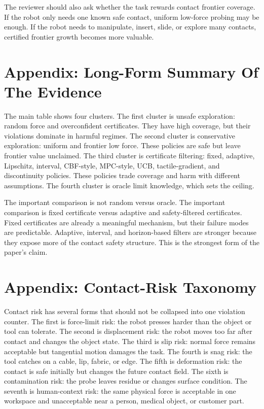 \documentclass{article}
\begin{document}
The reviewer should also ask whether the task rewards contact frontier
coverage. If the robot only needs one known safe contact, uniform low-force
probing may be enough. If the robot needs to manipulate, insert, slide, or
explore many contacts, certified frontier growth becomes more valuable.

\section{Appendix: Long-Form Summary Of The Evidence}

The main table shows four clusters. The first cluster is unsafe exploration:
random force and overconfident certificates. They have high coverage, but their
violations dominate in harmful regimes. The second cluster is conservative
exploration: uniform and frontier low force. These policies are safe but leave
frontier value unclaimed. The third cluster is certificate filtering: fixed,
adaptive, Lipschitz, interval, CBF-style, MPC-style, UCB, tactile-gradient, and
discontinuity policies. These policies trade coverage and harm with different
assumptions. The fourth cluster is oracle limit knowledge, which sets the
ceiling.

The important comparison is not random versus oracle. The important comparison
is fixed certificate versus adaptive and safety-filtered certificates. Fixed
certificates are already a meaningful mechanism, but their failure modes are
predictable. Adaptive, interval, and horizon-based filters are stronger because
they expose more of the contact safety structure. This is the strongest form of
the paper's claim.

\section{Appendix: Contact-Risk Taxonomy}

Contact risk has several forms that should not be collapsed into one violation
counter. The first is force-limit risk: the robot presses harder than the
object or tool can tolerate. The second is displacement risk: the robot moves
too far after contact and changes the object state. The third is slip risk:
normal force remains acceptable but tangential motion damages the task. The
fourth is snag risk: the tool catches on a cable, lip, fabric, or edge. The
fifth is deformation risk: the contact is safe initially but changes the future
contact field. The sixth is contamination risk: the probe leaves residue or
changes surface condition. The seventh is human-context risk: the same
physical force is acceptable in one workspace and unacceptable near a person,
medical object, or customer part.
\end{document}
